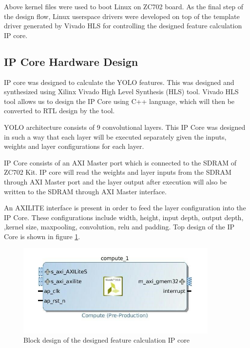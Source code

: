 \documentclass[12pt,a4paper]{report}
\begin{document}
\par Above kernel files were used to boot Linux on ZC702 board. As the final step of the design flow, Linux userspace drivers were developed on top of the template driver generated by Vivado HLS for controlling the designed feature calculation IP core. 

\subsection{IP Core Hardware Design} 
IP core was designed to calculate the YOLO features. This was designed and synthesized using Xilinx Vivado High Level Synthesis (HLS) tool. Vivado HLS tool allows us to design the IP Core using C++ language, which will then be converted to RTL design by the tool.
\par YOLO architecture consists of 9 convolutional layers. This IP Core was designed in such a way that each layer will be executed separately given the inputs, weights and layer configurations for each layer.
\par IP Core consists of an AXI Master port which is connected to the SDRAM of ZC702 Kit. IP core will read the weights and layer inputs from the SDRAM through AXI Master port and the layer output after execution will also be written to the SDRAM through AXI Master interface. 
\par An AXILITE interface is present in order to feed the layer configuration into the IP Core. These configurations include width, height, input depth, output depth, ,kernel size, maxpooling, convolution, relu and padding.
\noindent Top design of the IP Core is shown in figure \ref{ip}.
\begin{figure}[H]
\includegraphics[width=10cm]{ip.jpg}
\centering
\caption{Block design of the designed feature calculation IP core}
\label{ip}
\end{figure}
\end{document}
